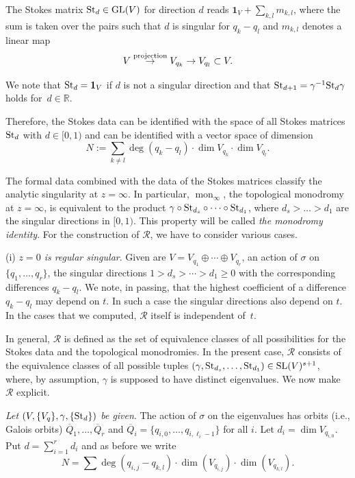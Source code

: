 \documentclass[10pt,a4paper]{amsart}
\numberwithin{equation}{section}
\begin{document}
The Stokes matrix
${\rm St}_d\in {\rm GL}(V)$ for direction $d$ reads $\mathbf{1}_V +\sum _{k,l}m_{k,l}$, where the sum is taken over the pairs such that $d$ is singular for $q_k-q_l$ and $m_{k,l}$ denotes a linear map \[
V\stackrel{\rm projection}{\rightarrow}V_{q_k}\rightarrow V_{q_l}\subset V.\]

 We note that ${\rm St}_d={\bf 1}_V$ if $d$ is not a singular direction and that ${\rm St}_{d+1}=\gamma^{-1} {\rm St}_d \gamma$ holds for~${ d\in \mathbb{R}}$.

 Therefore, the Stokes data can be identified with the space of all Stokes matrices ${\rm St}_d$
with $d\in [0,1)$ and can be identified with a vector space of dimension
\[
N:=\sum _{k\neq l} \deg (q_k-q_l)\cdot \dim V_{q_k}\cdot \dim V_{q_l}.\]



The formal data combined with the data of the Stokes matrices classify the analytic singularity at $z=\infty$. In particular,
$\operatorname{mon}_\infty$, the topological monodromy at $z=\infty$, is equivalent to the product $\gamma \circ {\rm St}_{d_s}\circ \dots \circ {\rm St}_{d_1}$,
where $d_s>\dots >d_1$ are the singular directions in $[0,1)$. This property will be called {\it the monodromy identity}. For the construction of
$\mathcal{R}$, we have to consider various cases.

 (i) {\it $z=0$ is regular singular}. Given are $V=V_{q_1}\oplus \cdots \oplus V_{q_r}$, an action
of $\sigma$ on $\{q_1,\dots , q_r\}$, the singular directions $1>d_s> \cdots >d_1\geq 0$ with the corresponding differences
$q_k-q_l$. We note, in passing, that the highest coefficient of a difference $q_k-q_l$ may depend on $t$. In such a case the
singular directions also depend on $t$. In the cases that we computed, $\mathcal{R}$ itself is independent of~$t$.

In general, $\mathcal{R}$ is defined as the set of equivalence classes of all possibilities for the Stokes data and the
topological monodromies. In the present case, $\mathcal{R}$ consists of the equivalence classes of all possible tuples
$(\gamma, {\rm St}_{d_s},\dots , {\rm St}_{d_1})\in {\rm SL}(V)^{s+1}$, where, by assumption, $\gamma$ is supposed to have
distinct eigenvalues. We now make $\mathcal{R}$ explicit.

{\it Let $(V,\{V_q\},\gamma ,\{{\rm St}_d\})$ be given}. The action of $\sigma $ on the eigenvalues has orbits (i.e., Galois orbits)
$\overline{Q}_1,\dots ,\overline{Q}_r$ and $\overline{Q}_i=\{q_{i,0},\dots ,q_{i,\ell_i-1}\}$ for all $i$. Let $d_i=\dim V_{q_{i,0}}$.
Put $d=\sum _{i=1}^rd_i $ and as before we write
\[
N=\sum \deg ( q_{i,j}-q_{k,l})\cdot \dim (V_{q_{i,j}})\cdot \dim (V_{q_{k,l}}).\]
\end{document}
